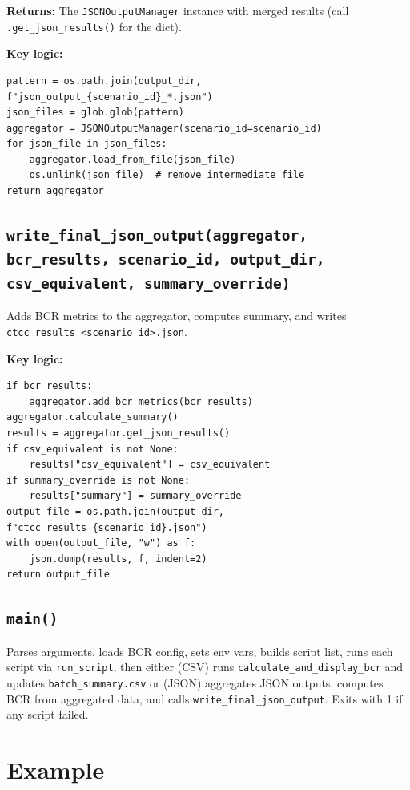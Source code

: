 \documentclass[ctcc_full_documentation.tex]{subfiles}
\begin{document}
\textbf{Returns:} The \texttt{JSONOutputManager} instance with merged results (call \texttt{.get\_json\_results()} for the dict).

\textbf{Key logic:}
\begin{lstlisting}
pattern = os.path.join(output_dir, f"json_output_{scenario_id}_*.json")
json_files = glob.glob(pattern)
aggregator = JSONOutputManager(scenario_id=scenario_id)
for json_file in json_files:
    aggregator.load_from_file(json_file)
    os.unlink(json_file)  # remove intermediate file
return aggregator
\end{lstlisting}

\subsection{\texttt{write\_final\_json\_output(aggregator, bcr\_results, scenario\_id, output\_dir, csv\_equivalent, summary\_override)}}

Adds BCR metrics to the aggregator, computes summary, and writes \texttt{ctcc\_results\_<scenario\_id>.json}.

\textbf{Key logic:}
\begin{lstlisting}
if bcr_results:
    aggregator.add_bcr_metrics(bcr_results)
aggregator.calculate_summary()
results = aggregator.get_json_results()
if csv_equivalent is not None:
    results["csv_equivalent"] = csv_equivalent
if summary_override is not None:
    results["summary"] = summary_override
output_file = os.path.join(output_dir, f"ctcc_results_{scenario_id}.json")
with open(output_file, "w") as f:
    json.dump(results, f, indent=2)
return output_file
\end{lstlisting}

\subsection{\texttt{main()}}

Parses arguments, loads BCR config, sets env vars, builds script list, runs each script via \texttt{run\_script}, then either (CSV) runs \texttt{calculate\_and\_display\_bcr} and updates \texttt{batch\_summary.csv} or (JSON) aggregates JSON outputs, computes BCR from aggregated data, and calls \texttt{write\_final\_json\_output}. Exits with 1 if any script failed.

\section{Example}
\end{document}
